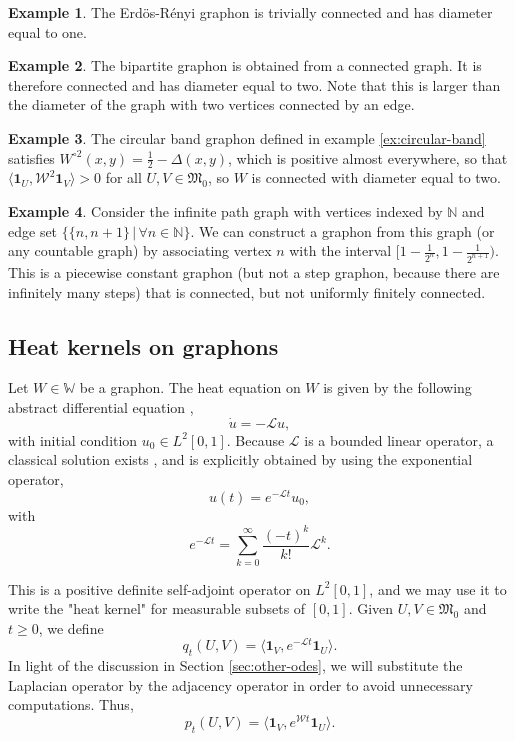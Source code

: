 \documentclass[11pt]{article}
\def\N{\mathbb{N}}
\def\WW{\mathbb{W}}
\def\II{\bm{1}}
\def\calW{\mathcal{W}}
\def\frakM{\mathfrak{M}_0}
\theoremstyle{definition}
\newtheorem{example}{Example}
\begin{document}
\begin{example}
    The Erd\"os-Rényi graphon is trivially connected and has diameter equal to one.
\end{example}

\begin{example}
    The bipartite graphon is obtained from a connected graph. It is therefore connected and has diameter equal to two. Note that this is larger than the diameter of the graph with two vertices connected by an edge.
\end{example}

\begin{example}
    The circular band graphon defined in example \ref{ex:circular-band} satisfies $W^{\circ 2}(x,y) = \frac{1}{2}-\Delta(x,y)$, which is positive almost everywhere, so that $\langle \II_U, \calW^2 \II_V \rangle >0$ for all $U,V\in\frakM$, so $W$ is connected with diameter equal to two.
\end{example}

\begin{example}
    Consider the infinite path graph with vertices indexed by $\N$ and edge set $\{\{n,n+1\} \,|\, \forall n\in \N\}$. We can construct a graphon from this graph (or any countable graph) by associating vertex $n$ with the interval $[1-\frac{1}{2^n},1-\frac{1}{2^{n+1}})$. This is a piecewise constant graphon (but not a step graphon, because there are infinitely many steps) that is connected, but not uniformly finitely connected.
\end{example}

\subsection{Heat kernels on graphons} \label{sec:graphon-heat}

Let $W \in \WW$ be a graphon. The heat equation on $W$ is given by the following abstract differential equation \cite{Petit2019RandomWO},
$$ \dot{u} = - \mathcal{L} u, $$
with initial condition $u_0 \in L^2 [0,1]$. Because $\mathcal{L}$ is a bounded linear operator, a classical solution exists \cite{CurtainZwart2020}, and is explicitly obtained by using the exponential operator,
$$ u(t) = e^{-\mathcal{L}t} u_0, $$
with
$$ e^{-\mathcal{L}t} = \sum_{k=0}^\infty \frac{(-t)^k}{k!} \mathcal{L}^k. $$

This is a positive definite self-adjoint operator on $L^2 [0,1]$, and we may use it to write the "heat kernel" for measurable subsets of $[0,1]$. Given $U,V \in \mathfrak{M}_0$ and $t\ge 0$, we define
$$ q_t (U,V) = \langle \II_V, e^{-\mathcal{L}t} \II_U \rangle. $$
In light of the discussion in Section \ref{sec:other-odes}, we will substitute the Laplacian operator by the adjacency operator in order to avoid unnecessary computations. Thus,
$$ p_t(U,V) = \langle \II_V, e^{\mathcal{W}t} \II_U \rangle. $$
\end{document}
